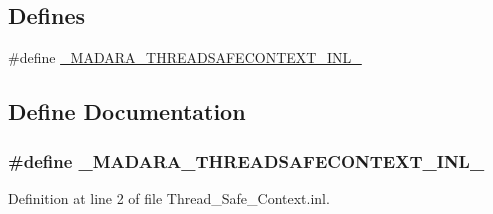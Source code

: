 \subsection*{Defines}
\begin{DoxyCompactItemize}
\item 
\#define \hyperlink{Thread__Safe__Context_8inl_aff5a4d45ba6e3ab85e2469bc329bd612}{\_\-MADARA\_\-THREADSAFECONTEXT\_\-INL\_\-}
\end{DoxyCompactItemize}


\subsection{Define Documentation}
\hypertarget{Thread__Safe__Context_8inl_aff5a4d45ba6e3ab85e2469bc329bd612}{
\subsubsection[{\_\-MADARA\_\-THREADSAFECONTEXT\_\-INL\_\-}]{\setlength{\rightskip}{0pt plus 5cm}\#define \_\-MADARA\_\-THREADSAFECONTEXT\_\-INL\_\-}}
\label{d8/dd5/Thread__Safe__Context_8inl_aff5a4d45ba6e3ab85e2469bc329bd612}


Definition at line 2 of file Thread\_\-Safe\_\-Context.inl.

